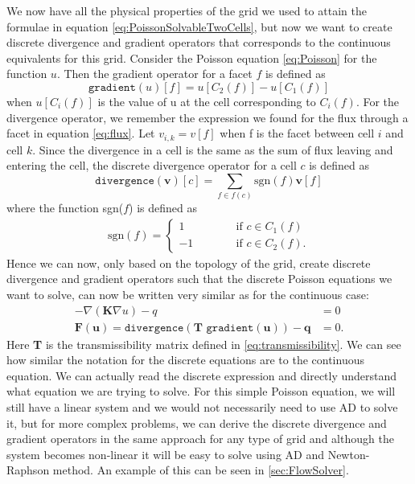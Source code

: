 We now have all the physical properties of the grid we used to attain the formulae in equation \eqref{eq:PoissonSolvableTwoCells}, but now we want to create discrete divergence and gradient operators that corresponds to the continuous equivalents for this grid. Consider the Poisson equation \eqref{eq:Poisson} for the function $u$. Then the gradient operator for a facet $f$ is defined as 
\begin{equation}
    \texttt{gradient}(u)[f] = u[C_2(f)] - u[C_1(f)] 
    \label{eq:discreteGradient}
\end{equation}
when $u[C_i(f)]$ is the value of u at the cell corresponding to $C_i(f)$. For the divergence operator, we remember the expression we found for the flux through a facet in equation \eqref{eq:flux}. Let $v_{i,k} = v[f]$ when f is the facet between cell $i$ and cell $k$. Since the divergence in a cell is the same as the sum of flux leaving and entering the cell, the discrete divergence operator for a cell $c$ is defined as 
\begin{equation*}
    \texttt{divergence}(\textbf{v})[c] = \sum_{f\in f(c)} \text{sgn}(f)\textbf{v}[f]
\end{equation*}
where the function sgn($f$) is defined as 
\begin{align*}
    \text{sgn}(f) = \left\lbrace
    \begin{array}{rl}
        1 \hspace{3em}&\text{if } c \in C_1(f)\\
        -1 \hspace{3em}&\text{if } c \in C_2(f).
    \end{array}
    \right.
\end{align*}
Hence we can now, only based on the topology of the grid, create discrete divergence and gradient operators such that the discrete Poisson equations we want to solve, can now be written very similar as for the continuous case:
\begin{align*}
    -\nabla(\textbf{K}\nabla u) - q &= 0 \\
    \textbf{F}(\textbf{u}) = \texttt{divergence}(\textbf{T }\texttt{gradient}(\textbf{u}))-\textbf{q} &= 0.
\end{align*}
Here \textbf{T} is the transmissibility matrix defined in \eqref{eq:transmissibility}. We can see how similar the notation for the discrete equations are to the continuous equation. We can actually read the discrete expression and directly understand what equation we are trying to solve. For this simple Poisson equation, we will still have a linear system and we would not necessarily need to use AD to solve it, but for more complex problems, we can derive the discrete divergence and gradient operators in the same approach for any type of grid and although the system becomes non-linear it will be easy to solve using AD and Newton-Raphson method. An example of this can be seen in \autoref{sec:FlowSolver}.

 




























